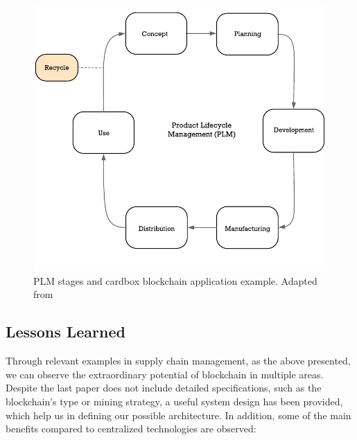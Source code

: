 \begin{figure}
	\includegraphics[width=1\linewidth]{gfx/supplyChain}    
  \caption{ PLM stages and cardbox blockchain application example. Adapted from \citep{stark2015product}}
  \label{fig:supplyChain}
\end{figure}

\subsection{Lessons Learned}

Through relevant examples in supply chain management, as the above presented, we can observe the extraordinary potential of blockchain in multiple areas. Despite the last paper does not include detailed specifications, such as the blockchain's type or mining strategy, a useful system design has been provided, which help us in defining our possible architecture. In addition, some of the main benefits compared to centralized technologies are observed:

